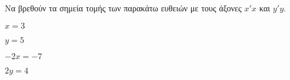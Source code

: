 Να βρεθούν τα σημεία τομής των παρακάτω ευθειών με τους άξονες $ x'x $ και $ y'y $.
\begin{multicols}{2}
\begin{rlist}[leftmargin=5mm]
\item $ x=3 $
\item $ y=5 $
\item $ -2x=-7 $
\item $ 2y=4 $
\end{rlist}
\end{multicols}
